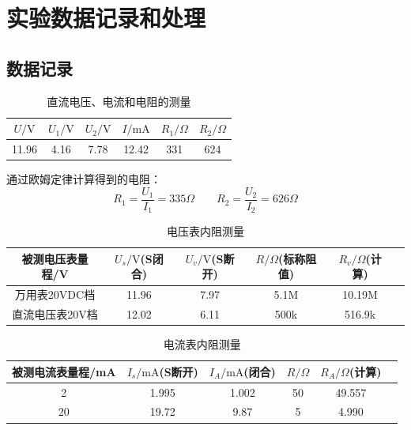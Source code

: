 \documentclass[10.5pt]{config}
\begin{document}
\section{实验数据记录和处理}
\subsection{数据记录}

\begin{table}[H]
    \centering
    \begin{tabular}{|c|c|c|c|c|c|}
      \hline
      $U/\mathrm{V}$ & $U_1/\mathrm{V}$ & $U_2/\mathrm{V}$ & $I/\mathrm{mA}$ & $R_1/\Omega$ & $R_2/\Omega$ \\
      \hline
      11.96 & 4.16 & 7.78 & 12.42 & 331 & 624 \\
      \hline
    \end{tabular}
    \caption{直流电压、电流和电阻的测量}
    \label{tab:exp_data}
\end{table}
通过欧姆定律计算得到的电阻：
$$ R_1 = \frac{U_1}{I_1}=335\Omega \quad\quad R_2 = \frac{U_2}{I_2}=626\Omega $$

\begin{table}[H]
    \centering
    \begin{tabular}{|c|c|c|c|c|c|}
      \hline
      被测电压表量程/V & $U_s/\mathrm{V}$(S闭合) & $U_v/\mathrm{V}$(S断开) & $R/\Omega$(标称阻值) & $R_v/\Omega$(计算) \\
      \hline
      万用表20VDC档 & 11.96 & 7.97 & 5.1M & 10.19M \\
      \hline
      直流电压表20V档 & 12.02 & 6.11 & 500k & 516.9k \\
      \hline
    \end{tabular}
    \caption{电压表内阻测量}
    \label{tab:exp_data}
\end{table}

\begin{table}[H]
    \centering
    \begin{tabular}{|c|c|c|c|c|c|}
      \hline
      被测电流表量程/mA & $I_s/\mathrm{mA}$(S断开) & $I_A/\mathrm{mA}$(闭合) & $R/\Omega$ & $R_A/\Omega$(计算) \\
      \hline
      2 & 1.995 & 1.002 & 50 & 49.557 \\
      \hline
      20 & 19.72 & 9.87 & 5 & 4.990 \\
      \hline
    \end{tabular}
    \caption{电流表内阻测量}
    \label{tab:exp_data}
\end{table}
\end{document}

